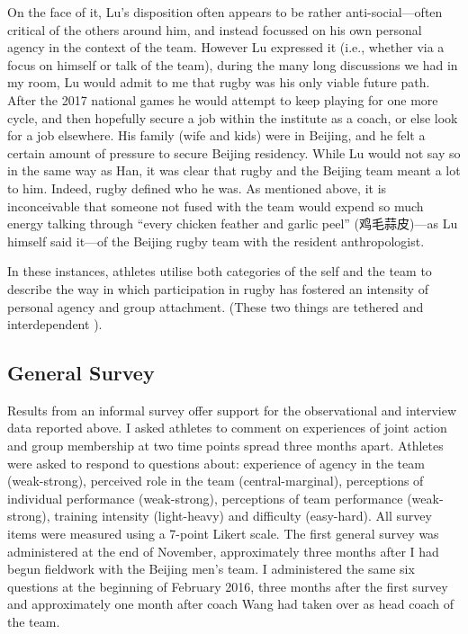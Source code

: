 \begin{CJK}{UTF8}{gbsn}
On the face of it, Lu's disposition often appears to be rather anti-social---often critical of the others around him, and instead focussed on his own personal agency in the context of the team.  However Lu expressed it (i.e., whether via a focus on himself or talk of the team), during the many long discussions we had in my room, Lu would admit to me that rugby was his only viable future path.  After the 2017 national games he would attempt to keep playing for one more cycle, and then hopefully secure a job within the institute as a coach, or else look for a job elsewhere.  His family (wife and kids) were in Beijing, and he felt a certain amount of pressure to secure Beijing residency.  While Lu would not say so in the same way as Han, it was clear that rugby and the Beijing team meant a lot to him. Indeed, rugby defined who he was.  As mentioned above, it is inconceivable that someone not fused with the team would expend so much energy talking through ``every chicken feather and garlic peel'' (鸡毛蒜皮)---as Lu himself said it---of the Beijing rugby team with the resident anthropologist.

In these instances, athletes utilise both categories of the self and the team to describe the way in which participation in rugby has fostered an intensity of personal agency and group attachment.  (These two things are tethered and interdependent \citep{Kelso2016}).







\clearpage



\subsection{General Survey}

Results from an informal survey offer support for the observational and interview data reported above. I asked athletes to comment on experiences of joint action and group membership at two time points spread three months apart.  Athletes were asked to respond to questions about: experience of agency in the team (weak-strong), perceived role in the team (central-marginal), perceptions of individual performance (weak-strong), perceptions of team performance (weak-strong), training intensity (light-heavy) and difficulty (easy-hard).  All survey items were measured using a 7-point Likert scale.  The first general survey was administered at the end of November, approximately three months after I had begun fieldwork with the Beijing men's team.  I administered the same six questions at the beginning of February 2016, three months after the first survey and approximately one month after coach Wang had taken over as head coach of the team.


\end{CJK}

